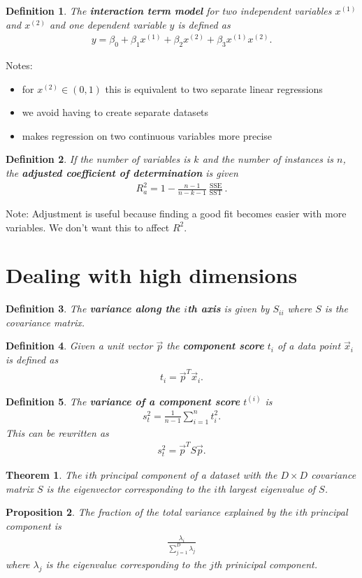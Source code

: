 \documentclass{article}
\theoremstyle{sltheorem}
\newtheorem{definition}{Definition}[section]
\newtheorem{theorem}{Theorem}[section]
\newtheorem{proposition}[theorem]{Proposition}
\DeclareMathOperator{\sst}{SST}
\DeclareMathOperator{\sse}{SSE}
\newcommand*\B[1]{\textbf{#1}}
\begin{document}
\begin{definition}
	The \B{interaction term model} for two independent variables $x^{(1)}$ and $x^{(2)}$ and one dependent variable $y$
	is defined as
	\begin{align*}
		y = \beta_0 + \beta_1 x^{(1)} + \beta_2 x^{(2)} + \beta_3 x^{(1)}x^{(2)}.
	\end{align*}
\end{definition}
Notes:
\begin{itemize}
	\item for $x^{(2)}\in (0,1)$ this is equivalent to two separate linear regressions
	\item we avoid having to create separate datasets
	\item makes regression on two continuous variables more precise
\end{itemize}
\begin{definition}
	If the number of variables is $k$ and the number of instances is $n$, the
	\B{adjusted coefficient of determination} is given
	\begin{align*}
		R^2_a = 1 - \frac{n-1}{n-k-1}\frac{\sse}{\sst}.
	\end{align*}
\end{definition}
Note: Adjustment is useful because finding a good fit becomes easier with more variables. We don't want this to affect $R^2$.
\section{Dealing with high dimensions}
\begin{definition}
	The \B{variance along the $i$th axis} is given by $S_{ii}$ where $S$ is the
	covariance matrix.
\end{definition}
\begin{definition}
	Given a unit vector $\vec p$ the \B{component score} $t_i$ of a data point
	$\vec x_i$ is defined as
	\begin{align*}
		t_i = {\vec p}^{T} \vec x_i.
	\end{align*}
\end{definition}
\begin{definition}
	The \B{variance of a component score} $t^{(i)}$ is
	\begin{align*}
		s_t^2 = \frac{1}{n-1}\sum_{i=1}^n t_i^2.
	\end{align*}
	This can be rewritten as
	\begin{align*}
		s^2_t = \vec p^T S\vec p.
	\end{align*}
\end{definition}
\begin{theorem}
	The $i$th principal component of a dataset with the $D\times D$ covariance
	matrix $S$ is the eigenvector corresponding to the $i$th largest eigenvalue 
	of $S$.
\end{theorem}
\begin{proposition}
	The fraction of the total variance explained by the $i$th principal component
	is 
	\begin{align*}
		\frac{\lambda_i}{\sum_{j=1}^D \lambda_j}
	\end{align*}
	where $\lambda_j$ is the eigenvalue corresponding to the $j$th prinicipal
	component.
\end{proposition}
\end{document}
